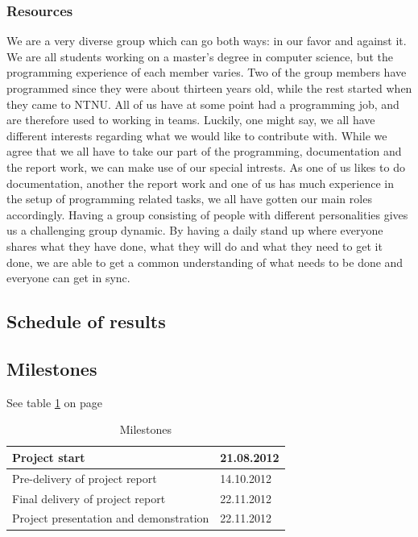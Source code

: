\subsubsection{Resources}
We are a very diverse group which can go both ways: in our favor and against it. We are all students working on a master's degree in computer science, but the programming experience of each member varies. Two of the group members have
programmed since they were about thirteen years old, while the rest started when they came to NTNU. All of us have at some point had a programming job, and are therefore used to working in teams.
\newline
\newline
Luckily, one might say, we all have different interests regarding what we would like to contribute with. While we agree that we all have to take our part of the programming, documentation and the report work, we can make use of our special intrests. As one of us likes to do documentation, another the report work and one of us has much experience in the setup of programming related tasks, we all have gotten our main roles accordingly.
\newline
\newline
Having a group consisting of people with different personalities gives us a challenging group dynamic. By having a daily stand up where everyone shares what they have done, what they will do and what they need to get it done, we are able to get a common understanding of what needs to be done and everyone can get in sync. 

\subsection{Schedule of results}

\subsection*{Milestones}
See table \ref{tab:milestones} on page \pageref{tab:milestones}
\begin{table}
\begin{tabular}{l|l}
Project start &  21.08.2012\\ \hline
Pre-delivery of project report & 14.10.2012\\ \hline
Final delivery of project report & 22.11.2012\\ \hline
Project presentation and demonstration & 22.11.2012
\end{tabular}
\caption{Milestones} \label{tab:milestones}
\end{table}

